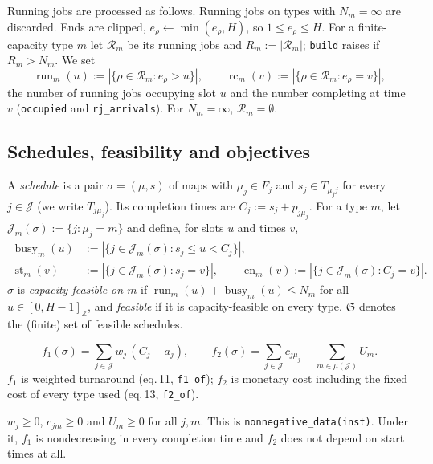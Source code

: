 \documentclass[11pt,a4paper]{article}
\newcommand{\J}{\mathcal{J}}
\newcommand{\Sched}{\mathfrak{S}}
\newcommand{\Run}{\operatorname{run}}
\newcommand{\Busy}{\operatorname{busy}}
\newcommand{\Starts}{\operatorname{st}}
\newcommand{\Ends}{\operatorname{en}}
\newcommand{\Rc}{\operatorname{rc}}
\newcommand{\Z}{\mathbb{Z}}
\newcommand{\code}[1]{\texttt{#1}}
\begin{document}
Running jobs are processed as follows. Running jobs on types with
$N_m=\infty$ are discarded. Ends are clipped, $e_\rho\leftarrow\min(e_\rho,H)$,
so $1\le e_\rho\le H$. For a finite-capacity type $m$ let $\mathcal{R}_m$ be
its running jobs and $R_m := |\mathcal{R}_m|$; \code{build} raises if
$R_m>N_m$. We set
\[
\Run_m(u) := |\{\rho\in\mathcal{R}_m : e_\rho>u\}|,\qquad
\Rc_m(v) := |\{\rho\in\mathcal{R}_m : e_\rho=v\}|,
\]
the number of running jobs occupying slot $u$ and the number completing at
time $v$ (\code{occupied} and \code{rj\_arrivals}). For $N_m=\infty$,
$\mathcal R_m=\emptyset$.

\subsection{Schedules, feasibility and objectives}

\begin{definition}[Schedule]
A \emph{schedule} is a pair $\sigma=(\mu,s)$ of maps with $\mu_j\in F_j$ and
$s_j\in T_{\mu_j j}$ for every $j\in\J$ (we write $T_{j\mu_j}$). Its
completion times are $C_j := s_j + p_{j\mu_j}$. For a type $m$, let
$\J_m(\sigma) := \{j:\mu_j=m\}$ and define, for slots $u$ and times $v$,
\begin{align*}
\Busy_m(u) &:= |\{j\in\J_m(\sigma) : s_j\le u< C_j\}|,\\
\Starts_m(v) &:= |\{j\in\J_m(\sigma): s_j=v\}|,\qquad
\Ends_m(v) := |\{j\in\J_m(\sigma): C_j=v\}|.
\end{align*}
$\sigma$ is \emph{capacity-feasible on $m$} if
$\Run_m(u)+\Busy_m(u)\le N_m$ for all $u\in[0,H-1]_\Z$, and \emph{feasible}
if it is capacity-feasible on every type. $\Sched$ denotes the (finite) set
of feasible schedules.
\end{definition}

\begin{definition}[Objectives]
\[
f_1(\sigma) = \sum_{j\in\J} w_j\,(C_j-a_j),\qquad
f_2(\sigma) = \sum_{j\in\J} c_{j\mu_j} + \sum_{m\in\mu(\J)} U_m .
\]
$f_1$ is weighted turnaround (eq.\,11, \code{f1\_of}); $f_2$ is monetary cost
including the fixed cost of every type used (eq.\,13, \code{f2\_of}).
\end{definition}

\begin{assumption}\label{ass:nonneg}
$w_j\ge0$, $c_{jm}\ge0$ and $U_m\ge0$ for all $j,m$. This is
\code{nonnegative\_data(inst)}. Under it, $f_1$ is nondecreasing in every
completion time and $f_2$ does not depend on start times at all.
\end{assumption}
\end{document}
